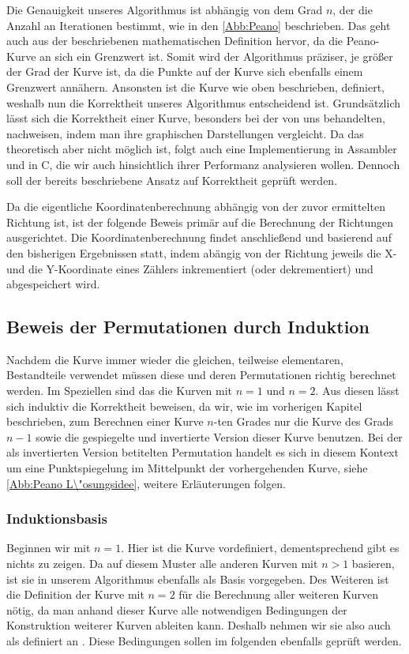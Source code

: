 \documentclass[course=asp]{aspdoc}
\begin{document}
Die Genauigkeit unseres Algorithmus ist abh\"angig von dem Grad $n$, der die Anzahl an Iterationen bestimmt, wie in den \ref{Abb:Peano} beschrieben. Das geht auch aus der beschriebenen mathematischen Definition hervor, da die Peano-Kurve an sich ein Grenzwert ist. Somit wird der Algorithmus pr\"aziser, je gr\"o\ss er der Grad der Kurve ist, da die Punkte auf der Kurve sich ebenfalls einem Grenzwert ann\"ahern. Ansonsten ist die Kurve wie oben beschrieben, definiert, weshalb nun die Korrektheit unseres Algorithmus entscheidend ist.
Grunds\"atzlich l\"asst sich die Korrektheit einer Kurve, besonders bei der von uns behandelten, nachweisen, indem man ihre graphischen Darstellungen vergleicht. Da das theoretisch aber nicht m\"oglich ist, folgt auch eine Implementierung in Assambler und in C, die wir auch hinsichtlich ihrer Performanz analysieren wollen.
Dennoch soll der bereits beschriebene Ansatz auf Korrektheit gepr\"uft werden.


Da die eigentliche Koordinatenberechnung abh\"angig von der zuvor ermittelten Richtung ist, ist der folgende Beweis prim\"ar auf die Berechnung der Richtungen ausgerichtet.
Die Koordinatenberechnung findet anschlie\ss end und basierend auf den bisherigen Ergebnissen statt, indem ab\"angig von der Richtung jeweils die X- und die Y-Koordinate eines Z\"ahlers inkrementiert (oder dekrementiert) und abgespeichert wird.

\subsection{Beweis der Permutationen durch Induktion} \label{Beweis der Permutationen durch Induktion}
Nachdem die Kurve immer wieder die gleichen, teilweise elementaren, Bestandteile verwendet m\"ussen diese und deren Permutationen richtig berechnet werden. Im Speziellen sind das die Kurven mit $n = 1$ und $n = 2$. Aus diesen l\"asst sich induktiv die Korrektheit beweisen, da wir, wie im vorherigen Kapitel beschrieben, zum Berechnen einer Kurve $n$-ten Grades nur die Kurve des Grads $n - 1$ sowie die gespiegelte und invertierte Version dieser Kurve benutzen. Bei der als invertierten Version betitelten Permutation handelt es sich in diesem Kontext um eine Punktspiegelung im Mittelpunkt der vorhergehenden Kurve, siehe \ref{Abb:Peano L\"osungsidee}, weitere Erl\"auterungen folgen.	%

\subsubsection{Induktionsbasis} \label{Induktionsbasis}
Beginnen wir mit $n = 1$. Hier ist die Kurve vordefiniert, dementsprechend gibt es nichts zu zeigen. Da auf diesem Muster alle anderen Kurven mit $n > 1$ basieren, ist sie in unserem Algorithmus ebenfalls als Basis vorgegeben.
Des Weiteren ist die Definition der Kurve mit $n = 2$ f\"ur die Berechnung aller weiteren Kurven n\"otig, da man anhand dieser Kurve alle notwendigen Bedingungen der Konstruktion weiterer Kurven ableiten kann. Deshalb nehmen wir sie also auch als definiert an \cite{aufgabenstellung}. Diese Bedingungen sollen im folgenden ebenfalls gepr\"uft werden.
\end{document}
